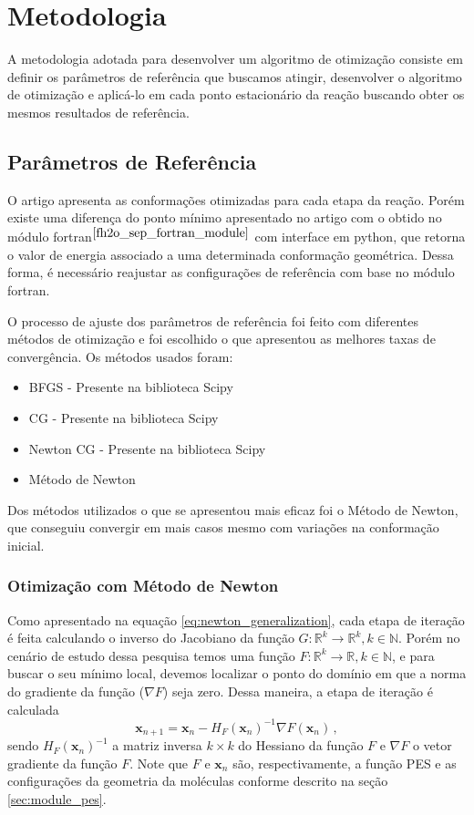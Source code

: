 \section{Metodologia}

A metodologia adotada para desenvolver um algoritmo de otimização consiste em definir os parâmetros de referência que buscamos atingir, desenvolver o algoritmo de otimização e aplicá-lo em cada ponto estacionário da reação buscando obter os mesmos resultados de referência.

\subsection{Parâmetros de Referência}

O artigo \cite{fh2o_first_sep} apresenta as conformações otimizadas para cada etapa da reação. Porém existe uma diferença do ponto mínimo apresentado no artigo com o obtido no módulo fortran$^{ \cite{fh2o_sep_fortran_module} }$ com interface em python, que retorna o valor de energia associado a uma determinada conformação geométrica. Dessa forma, é necessário reajustar as configurações de referência com base no módulo fortran.

O processo de ajuste dos parâmetros de referência foi feito com diferentes métodos de otimização e foi escolhido o que apresentou as melhores taxas de convergência. Os métodos usados foram:
%
\begin{itemize}[itemsep=0pt,parsep=0pt]
  \item BFGS - Presente na biblioteca Scipy
  \item CG - Presente na biblioteca Scipy
  \item Newton CG - Presente na biblioteca Scipy
  \item Método de Newton
\end{itemize}
%
Dos métodos utilizados o que se apresentou mais eficaz foi o Método de Newton, que conseguiu convergir em mais casos mesmo com variações na conformação inicial.

\subsubsection{Otimização com Método de Newton}

Como apresentado na equação \eqref{eq:newton_generalization}, cada etapa de iteração é feita calculando o inverso do Jacobiano da função $G: {\mathds{R}^k\to\mathds{R}^k}, k \in \mathds{N}$. Porém no cenário de estudo dessa pesquisa temos uma função $F: {\mathds{R}^k\to\mathds{R}}, k \in \mathds{N}$, e para buscar o seu mínimo local, devemos localizar o ponto do domínio em que a norma do gradiente da função ($\nabla F$) seja zero. Dessa maneira, a etapa de iteração é calculada %
%
\begin{equation}
  \mathbf{x}_{n+1} = \mathbf{x}_n - H_F(\mathbf{x}_n)^{-1} \nabla F(\mathbf{x}_n) \,,
\end{equation}
%
sendo $H_F(\mathbf{x}_n)^{-1}$ a matriz inversa $k \times k$ do Hessiano da função $F$ e $\nabla F$ o vetor gradiente da função $F$. Note que $F$ e $\mathbf{x}_n$ são, respectivamente, a função PES e as configurações da geometria da moléculas conforme descrito na seção \ref{sec:module_pes}. 

